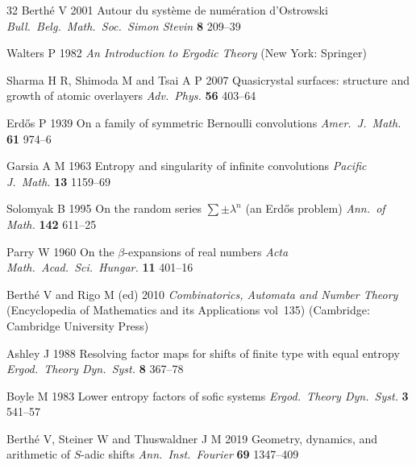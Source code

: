 \begin{thebibliography}{32}
Berth\'e V 2001
Autour du syst\`eme de num\'eration d'Ostrowski
\textit{Bull.\ Belg.\ Math.\ Soc.\ Simon Stevin} \textbf{8} 209--39

Walters P 1982
\textit{An Introduction to Ergodic Theory}
(New York: Springer)

Sharma H R, Shimoda M and Tsai A P 2007
Quasicrystal surfaces: structure and growth of atomic overlayers
\textit{Adv.\ Phys.} \textbf{56} 403--64

Erd\H{o}s P 1939
On a family of symmetric Bernoulli convolutions
\textit{Amer.\ J.\ Math.} \textbf{61} 974--6

Garsia A M 1963
Entropy and singularity of infinite convolutions
\textit{Pacific J.\ Math.} \textbf{13} 1159--69

Solomyak B 1995
On the random series $\sum\pm\lambda^n$ (an Erd\H{o}s problem)
\textit{Ann.\ of Math.} \textbf{142} 611--25

Parry W 1960
On the $\beta$-expansions of real numbers
\textit{Acta Math.\ Acad.\ Sci.\ Hungar.} \textbf{11} 401--16

Berth\'e V and Rigo M (ed) 2010
\textit{Combinatorics, Automata and Number Theory}
(Encyclopedia of Mathematics and its Applications vol~135)
(Cambridge: Cambridge University Press)

Ashley J 1988
Resolving factor maps for shifts of finite type with equal entropy
\textit{Ergod.\ Theory Dyn.\ Syst.} \textbf{8} 367--78

Boyle M 1983
Lower entropy factors of sofic systems
\textit{Ergod.\ Theory Dyn.\ Syst.} \textbf{3} 541--57

Berth\'e V, Steiner W and Thuswaldner J M 2019
Geometry, dynamics, and arithmetic of $S$-adic shifts
\textit{Ann.\ Inst.\ Fourier} \textbf{69} 1347--409

\end{thebibliography}
